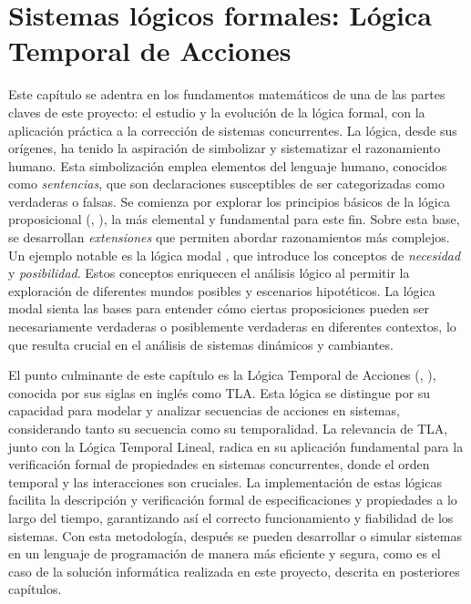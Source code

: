 \chapter{\textbf{Sistemas lógicos formales: Lógica Temporal de Acciones}}
Este capítulo se adentra en los fundamentos matemáticos de una de las partes claves de este proyecto: el estudio y la evolución de la lógica formal, con la aplicación práctica a la corrección de sistemas concurrentes. La lógica, desde sus orígenes, ha tenido la aspiración de simbolizar y sistematizar el razonamiento humano. Esta simbolización emplea elementos del lenguaje humano, conocidos como \textit{sentencias}, que son declaraciones susceptibles de ser categorizadas como verdaderas o falsas. Se comienza por explorar los principios básicos de la lógica proposicional (\cite[Capítulo 8]{monk1976mathematical},\cite{garciaolmedo2018lprop} ),  la más elemental y fundamental para este fin. Sobre esta base, se desarrollan \textit{extensiones} que permiten abordar razonamientos más complejos. Un ejemplo notable es la lógica modal \cite{jansana2003logicamodal}, que introduce los conceptos de \textit{necesidad} y \textit{posibilidad}. Estos conceptos enriquecen el análisis lógico al permitir la exploración de diferentes mundos posibles y escenarios hipotéticos. La lógica modal sienta las bases para entender cómo ciertas proposiciones pueden ser necesariamente verdaderas o posiblemente verdaderas en diferentes contextos, lo que resulta crucial en el análisis de sistemas dinámicos y cambiantes.

El punto culminante de este capítulo es la Lógica Temporal de Acciones (\cite{lamport1994temporal},\cite{abadi1990axiomatization} ), conocida por sus siglas en inglés como TLA. Esta lógica se distingue por su capacidad para modelar y analizar secuencias de acciones en sistemas, considerando tanto su secuencia como su temporalidad. La relevancia de TLA, junto con la Lógica Temporal Lineal, radica en su aplicación fundamental para la verificación formal de propiedades en sistemas concurrentes, donde el orden temporal y las interacciones son cruciales. La implementación de estas lógicas facilita la descripción y verificación formal de especificaciones y propiedades a lo largo del tiempo, garantizando así el correcto funcionamiento y fiabilidad de los sistemas. Con esta metodología, después se pueden desarrollar o simular sistemas en un lenguaje de programación de manera más eficiente y segura, como es el caso de la solución informática realizada en este proyecto, descrita en posteriores capítulos.

